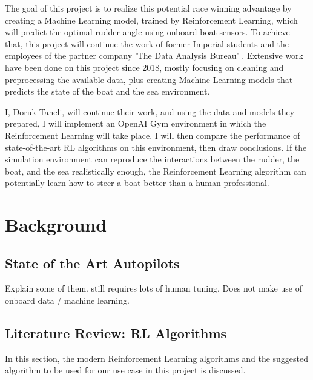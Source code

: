 \documentclass[12pt,twoside]{report}
\begin{document}
The goal of this project is to realize this potential race winning advantage by creating a Machine Learning model, trained by Reinforcement Learning, which will predict the optimal rudder angle using onboard boat sensors. To achieve that, this project will continue the work of former Imperial students and the employees of the partner company 'The Data Analysis Bureau' \cite{t-dab}. Extensive work have been done on this project since 2018, mostly focusing on cleaning and preprocessing the available data, plus creating Machine Learning models that predicts the state of the boat and the sea environment.

I, Doruk Taneli, will continue their work, and using the data and models they prepared, I will implement an OpenAI Gym environment in which the Reinforcement Learning will take place. I will then compare the performance of state-of-the-art RL algorithms on this environment, then draw conclusions. If the simulation environment can reproduce the interactions between the rudder, the boat, and the sea realistically enough, the Reinforcement Learning algorithm can potentially learn how to steer a boat better than a human professional.




\chapter{Background}

\section{State of the Art Autopilots}
Explain some of them.
still requires lots of human tuning.
Does not make use of onboard data / machine learning.

\section{Literature Review: RL Algorithms}
In this section, the modern Reinforcement Learning algorithms and the suggested algorithm to be used for our use case in this project is discussed.
\end{document}

